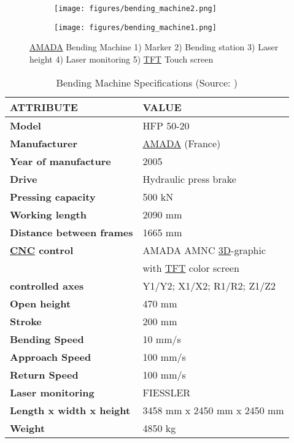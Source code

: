 \begin{figure}[h]
    \centering
    \begin{subfigure}{0.63\textwidth}
        \centering
        \texttt{[image: figures/bending\_machine2.png]} %
        \label{fig:bending_machine_sub1}
    \end{subfigure}\hfill
    \begin{subfigure}{0.355\textwidth}
        \centering
        \texttt{[image: figures/bending\_machine1.png]} %
        \label{fig:bending_machine_sub2}
    \end{subfigure}
    \caption{\hyperref[acro:AMADA]{AMADA} Bending Machine 1) Marker 2) Bending station 3) Laser height 4) Laser monitoring 5) \hyperref[acro:TFT]{TFT} Touch screen}
    \label{fig:bending_machine}
\end{figure}

\begin{table}[h!]
    \centering
    \begin{tabular}{ll}
        \MakeUppercase{\textbf{Attribute}} & \MakeUppercase{\textbf{Value}} \\
        \hline
        \textbf{Model} & HFP 50-20 \\
        \textbf{Manufacturer} & \hyperref[acro:AMADA]{AMADA} (France) \\
        \textbf{Year of manufacture} & 2005 \\
        \textbf{Drive} & Hydraulic press brake \\
        \textbf{Pressing capacity} & 500 kN \\
        \textbf{Working length} & 2090 mm \\
        \textbf{Distance between frames} & 1665 mm \\
        \textbf{\hyperref[acro:CNC]{CNC} control} & AMADA AMNC \hyperref[acro:3D]{3D}-graphic \\
        & with \hyperref[acro:TFT]{TFT} color screen \\
        \textbf{controlled axes} &  Y1/Y2; X1/X2; R1/R2; Z1/Z2 \\
        \textbf{Open height} & 470 mm \\
        \textbf{Stroke} & 200 mm \\
        \textbf{Bending Speed} & 10 mm/s \\
        \textbf{Approach Speed} & 100 mm/s \\
        \textbf{Return Speed} & 100 mm/s \\
        \textbf{Laser monitoring} & FIESSLER \\
        \textbf{Length x width x height} & 3458 mm x 2450 mm x 2450 mm \\
        \textbf{Weight} & 4850 kg \\ \hline
    \end{tabular}
    \caption{Bending Machine Specifications (Source: \cite{bmspecifications})}
    \label{tab:machine_specifications}
\end{table}

